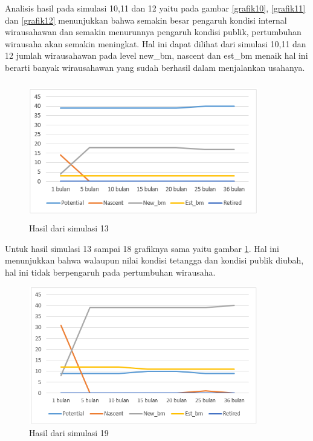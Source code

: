 Analisis hasil pada simulasi 10,11 dan 12 yaitu pada gambar \ref{grafik10}, \ref{grafik11} dan \ref{grafik12} menunjukkan bahwa semakin besar pengaruh kondisi internal wirausahawan dan semakin menurunnya pengaruh kondisi publik, pertumbuhan wirausaha akan semakin meningkat. Hal ini dapat dilihat dari simulasi 10,11 dan 12 jumlah wirausahawan pada level new\_bm, nascent dan est\_bm menaik hal ini berarti banyak wirausahawan yang sudah berhasil dalam menjalankan usahanya.

	\begin{figure} [H]
	\centering  
	\includegraphics[width=10cm, height=6cm]{grafik13} 
		\caption[Hasil dari simulasi 13]{Hasil dari simulasi 13}
	\label{grafik13} 
\end{figure}
Untuk hasil simulasi 13 sampai 18 grafiknya sama yaitu gambar \ref{grafik13}. Hal ini menunjukkan bahwa walaupun nilai kondisi tetangga dan kondisi publik diubah, hal ini tidak berpengaruh pada pertumbuhan wirausaha. 

	\begin{figure} [H]
	\centering  
	\includegraphics[width=10cm, height=6cm]{grafik19} 
		\caption[Hasil dari simulasi 19]{Hasil dari simulasi 19}
	\label{grafik19} 
\end{figure}

